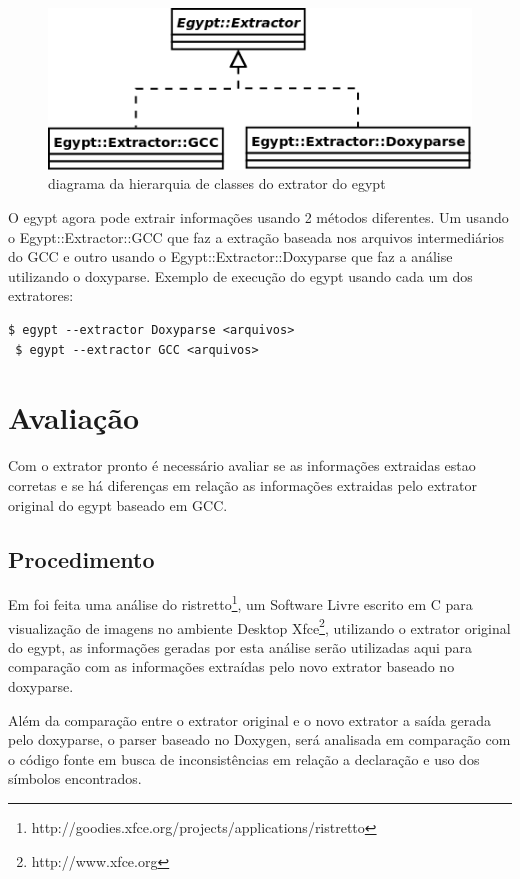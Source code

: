\begin{figure}[h]
\center
\includegraphics[scale=0.5]{imagens/egypt-diagram-extractor}
\caption{diagrama da hierarquia de classes do extrator do egypt}
\label{egypt-diagram-extractor}
\end{figure}

O egypt agora pode extrair informações usando 2 métodos diferentes. Um usando o
Egypt::Extractor::GCC que faz a extração baseada nos arquivos intermediários do
GCC e outro usando o Egypt::Extractor::Doxyparse que faz a análise utilizando o
doxyparse. Exemplo de execução do egypt usando cada um dos extratores:

\begin{Verbatim}[frame=single,fontsize=\relsize{-2},fontfamily=courier]
 $ egypt --extractor Doxyparse <arquivos>
 $ egypt --extractor GCC <arquivos>
\end{Verbatim}

\chapter{Avaliação}

Com o extrator pronto é necessário avaliar se as informações extraidas estao
corretas e se há diferenças em relação as informações extraidas pelo extrator
original do egypt baseado em GCC.

\section{Procedimento}

Em \cite{StructuralComplexityEvolution} foi feita uma análise do
ristretto\footnote{http://goodies.xfce.org/projects/applications/ristretto}, um
Software Livre escrito em C para visualização de imagens no ambiente Desktop
Xfce\footnote{http://www.xfce.org}, utilizando o extrator original do egypt, as
informações geradas por esta análise serão utilizadas aqui para comparação com
as informações extraídas pelo novo extrator baseado no doxyparse.

Além da comparação entre o extrator original e o novo extrator a saída
gerada pelo doxyparse, o parser baseado no Doxygen, será analisada em
comparação com o código fonte em busca de inconsistências em relação a
declaração e uso dos símbolos encontrados.

